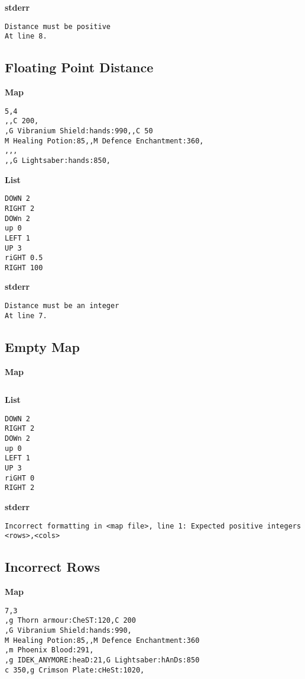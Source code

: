 \documentclass{article}
\begin{document}
\textbf{stderr}
\begin{lstlisting}
Distance must be positive
At line 8.
\end{lstlisting}

\subsection{Floating Point Distance}

\quad \textbf{Map}
\begin{lstlisting}
5,4
,,C 200,
,G Vibranium Shield:hands:990,,C 50
M Healing Potion:85,,M Defence Enchantment:360,
,,,
,,G Lightsaber:hands:850,
\end{lstlisting}

\textbf{List}
\begin{lstlisting}
DOWN 2
RIGHT 2
DOWn 2
up 0
LEFT 1
UP 3
riGHT 0.5
RIGHT 100
\end{lstlisting}
\pagebreak

\textbf{stderr}
\begin{lstlisting}
Distance must be an integer
At line 7.
\end{lstlisting}

\subsection{Empty Map}

\quad \textbf{Map}
\begin{lstlisting}

\end{lstlisting}

\textbf{List}
\begin{lstlisting}
DOWN 2
RIGHT 2
DOWn 2
up 0
LEFT 1
UP 3
riGHT 0
RIGHT 2
\end{lstlisting}
\pagebreak

\textbf{stderr}
\begin{lstlisting}
Incorrect formatting in <map file>, line 1: Expected positive integers <rows>,<cols>
\end{lstlisting}

\subsection{Incorrect Rows}

\quad \textbf{Map}
\begin{lstlisting}
7,3
,g Thorn armour:CheST:120,C 200
,G Vibranium Shield:hands:990,
M Healing Potion:85,,M Defence Enchantment:360
,m Phoenix Blood:291,
,g IDEK_ANYMORE:heaD:21,G Lightsaber:hAnDs:850
c 350,g Crimson Plate:cHeSt:1020,
\end{lstlisting}
\end{document}
